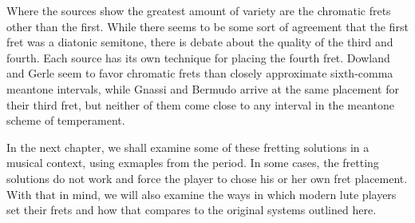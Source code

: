 Where the sources show the greatest amount of variety are the chromatic frets other than the
first.  While there seems to be some sort of agreement that the first fret was a diatonic
semitone, there is debate about the quality of the third and fourth.  Each source has its own
technique for placing the fourth fret.  Dowland and Gerle seem to favor chromatic frets than
closely approximate sixth-comma meantone intervals, while Gnassi and Bermudo arrive at the same
placement for their third fret, but neither of them come close to any interval in the meantone
scheme of temperament.

In the next chapter, we shall examine some of these fretting solutions in a musical context, using
exmaples from the period.  In some cases, the fretting solutions do not work and force the player
to chose his or her own fret placement.  With that in mind, we will also examine the ways in which
modern lute players set their frets and how that compares to the original systems outlined here.

